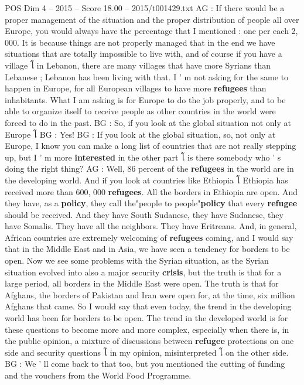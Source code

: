 \begin{textsample}{POS Dim 4 – 2015 – Score 18.00 – 2015/t001429.txt}
AG : If there would be a proper management of the situation and the proper distribution of people all over Europe, you would always have the percentage that I mentioned : one per each 2, 000.
It is because things are not properly managed that in the end we have situations that are totally impossible to live with, and of course if you have a village โ in Lebanon, there are many villages that have more Syrians than Lebanese ; Lebanon has been living with that.
I ' m not asking for the same to happen in Europe, for all European villages to have more \textbf{refugees} than inhabitants.
What I am asking is for Europe to do the job properly, and to be able to organize itself to receive people as other countries in the world were forced to do in the past.
BG : So, if you look at the global situation not only at Europe โ BG : Yes!
BG : If you look at the global situation, so, not only at Europe, I know you can make a long list of countries that are not really stepping up, but I ' m more \textbf{interested} in the other part โ is there somebody who ' s doing the right thing?
AG : Well, 86 percent of the \textbf{refugees} in the world are in the developing world.
And if you look at countries like Ethiopia โ Ethiopia has received more than 600, 000 \textbf{refugees}.
All the borders in Ethiopia are open.
And they have, as a \textbf{policy}, they call the"people to people"\textbf{policy} that every \textbf{refugee} should be received.
And they have South Sudanese, they have Sudanese, they have Somalis.
They have all the neighbors.
They have Eritreans.
And, in general, African countries are extremely welcoming of \textbf{refugees} coming, and I would say that in the Middle East and in Asia, we have seen a tendency for borders to be open.
Now we see some problems with the Syrian situation, as the Syrian situation evolved into also a major security \textbf{crisis}, but the truth is that for a large period, all borders in the Middle East were open.
The truth is that for Afghans, the borders of Pakistan and Iran were open for, at the time, six million Afghans that came.
So I would say that even today, the trend in the developing world has been for borders to be open.
The trend in the developed world is for these questions to become more and more complex, especially when there is, in the public opinion, a mixture of discussions between \textbf{refugee} protections on one side and security questions โ in my opinion, misinterpreted โ on the other side.
BG : We ' ll come back to that too, but you mentioned the cutting of funding and the vouchers from the World Food Programme.

\end{textsample}

